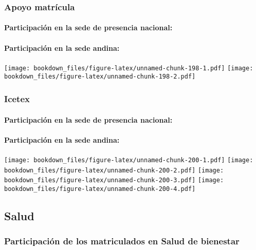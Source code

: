 \documentclass[]{article}
\let\oldparagraph\paragraph
\renewcommand{\paragraph}[1]{\oldparagraph{#1}\mbox{}}
\theoremstyle{definition}
\theoremstyle{definition}
\theoremstyle{definition}
\theoremstyle{remark}
\begin{document}
\subsubsection{Apoyo matrícula}\label{apoyo-matricula-1}

\paragraph{Participación en la sede de presencia
nacional:}\label{participacion-en-la-sede-de-presencia-nacional-15}

\paragraph{Participación en la sede
andina:}\label{participacion-en-la-sede-andina-15}

\texttt{[image: bookdown\_files/figure-latex/unnamed-chunk-198-1.pdf]}
\texttt{[image: bookdown\_files/figure-latex/unnamed-chunk-198-2.pdf]}

\subsubsection{Icetex}\label{icetex}

\paragraph{Participación en la sede de presencia
nacional:}\label{participacion-en-la-sede-de-presencia-nacional-16}

\paragraph{Participación en la sede
andina:}\label{participacion-en-la-sede-andina-16}

\texttt{[image: bookdown\_files/figure-latex/unnamed-chunk-200-1.pdf]}
\texttt{[image: bookdown\_files/figure-latex/unnamed-chunk-200-2.pdf]}
\texttt{[image: bookdown\_files/figure-latex/unnamed-chunk-200-3.pdf]}
\texttt{[image: bookdown\_files/figure-latex/unnamed-chunk-200-4.pdf]}

\subsection{Salud}\label{salud-1}

\subsubsection{Participación de los matriculados en Salud de
bienestar}\label{participacion-de-los-matriculados-en-salud-de-bienestar-1}
\end{document}
